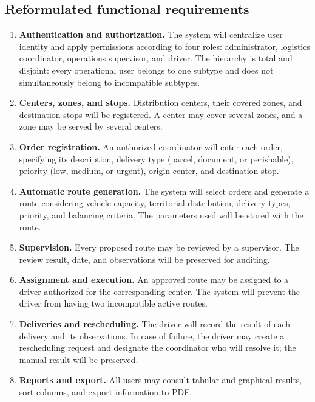 \documentclass[12pt,a4paper]{article}
\begin{document}
\subsection{Reformulated functional requirements}
\begin{enumerate}
\item \textbf{Authentication and authorization.} The system will centralize user identity and apply permissions according to four roles: administrator, logistics coordinator, operations supervisor, and driver. The hierarchy is total and disjoint: every operational user belongs to one subtype and does not simultaneously belong to incompatible subtypes.
\item \textbf{Centers, zones, and stops.} Distribution centers, their covered zones, and destination stops will be registered. A center may cover several zones, and a zone may be served by several centers.
\item \textbf{Order registration.} An authorized coordinator will enter each order, specifying its description, delivery type (parcel, document, or perishable), priority (low, medium, or urgent), origin center, and destination stop.
\item \textbf{Automatic route generation.} The system will select orders and generate a route considering vehicle capacity, territorial distribution, delivery types, priority, and balancing criteria. The parameters used will be stored with the route.
\item \textbf{Supervision.} Every proposed route may be reviewed by a supervisor. The review result, date, and observations will be preserved for auditing.
\item \textbf{Assignment and execution.} An approved route may be assigned to a driver authorized for the corresponding center. The system will prevent the driver from having two incompatible active routes.
\item \textbf{Deliveries and rescheduling.} The driver will record the result of each delivery and its observations. In case of failure, the driver may create a rescheduling request and designate the coordinator who will resolve it; the manual result will be preserved.
\item \textbf{Reports and export.} All users may consult tabular and graphical results, sort columns, and export information to PDF.
\end{enumerate}
\end{document}
